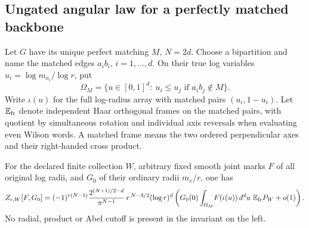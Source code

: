 \subsection{Ungated angular law for a perfectly matched backbone}

Let \(G\) have its unique perfect matching \(M\), \(N=2d\). Choose a bipartition and name the matched edges \(a_i b_i\), \(i=1,\ldots,d\). On their true log variables \(u_i=\log m_{a_i}/\log r\), put
\[
      \Omega_M=\{u\in[0,1]^d:\ u_i\leq u_j
                               \text{ if }a_i b_j\notin M\}.
\]
Write \(\iota(u)\) for the full log-radius array with matched pairs \((u_i,1-u_i)\). Let \(\mathbb E_{\rm fr}\) denote independent Haar orthogonal frames on the matched pairs, with quotient by simultaneous rotation and individual axis reversals when evaluating even Wilson words. A matched frame means the two ordered perpendicular axes and their right-handed cross product.

\begin{theorem}\label{thm:ang:perfect}
For the declared finite collection \(W\), arbitrary fixed smooth joint marks \(F\) of all original log radii, and \(G_0\) of their ordinary radii \(m_v/r\), one has
\begin{equation}
 \label{eq:ang:perfect}
 Z_{r,W}[F,G_0]
  =(-1)^{r(N-1)}
       \frac{2^{(N+1)/2-d}}{\pi^{N-1}}\,
             r^{\,N-3/2}(\log r)^d
       \left(G_0(0)\int_{\Omega_M}\! F(\iota(u))\,d^du\
                        \mathbb E_{\rm fr}P_W +o(1)\right).
\end{equation}
No radial, product or Abel cutoff is present in the invariant on the left.
\end{theorem}

